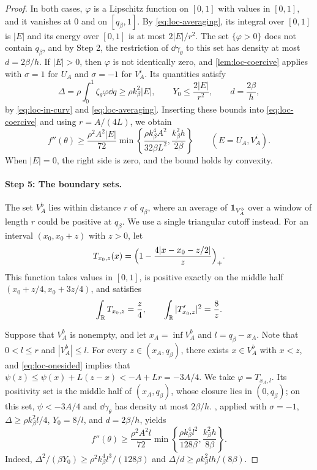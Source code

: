 \begin{proof}
In both cases, $\varphi$ is a Lipschitz function on $[0,1]$ with values in
$[0,1]$, and it vanishes at $0$ and on $[q_\beta,1]$. By
\eqref{eq:loc-averaging}, its integral over $[0,1]$ is $|E|$ and its energy
over $[0,1]$ is at most $2|E|/r^2$. The set $\{\varphi>0\}$
does not contain $q_\beta$, and by Step 2, the restriction of
$\dd\gamma_\theta$ to this set has density at most $d=2\beta/h$. If $|E|>0$,
then $\varphi$ is not identically zero, and \cref{lem:loc-coercive} applies
with $\sigma=1$ for $U_A$ and $\sigma=-1$ for $V_A^i$. Its quantities satisfy
\[
 \Delta=\rho\int_0^1\zeta_\theta\varphi\dd q\ge\rho k_\beta^2|E|,\qquad
 Y_0\le\frac{2|E|}{r^2},\qquad d=\frac{2\beta}h,
\]
by \eqref{eq:loc-in-curv} and \eqref{eq:loc-averaging}. Inserting these bounds
into \eqref{eq:loc-coercive} and using $r=A/(4L)$, we obtain
\begin{equation}\label{eq:loc-cutoff-interior}
 f''(\theta)\ge\frac{\rho^2A^2|E|}{72}
 \min\left\{\frac{\rho k_\beta^4A^2}{32\beta L^2},
 \frac{k_\beta^2h}{2\beta}\right\}
 \qquad(E=U_A,V_A^i).
\end{equation}
When $|E|=0$, the right side is zero, and the bound holds by convexity.

\paragraph{Step 5: The boundary sets.}
The set $V_A^b$ lies within distance $r$ of $q_\beta$, where an average of
$\mathbf1_{V_A^b}$ over a window of length $r$ could be positive at $q_\beta$. We
use a single triangular cutoff instead. For an interval $(x_0,x_0+z)$ with
$z>0$, let
\[
 T_{x_0,z}(x)=\Bigl(1-\frac{4|x-x_0-z/2|}{z}\Bigr)_+ .
\]
This function takes values in $[0,1]$, is positive exactly on the middle half
$(x_0+z/4,x_0+3z/4)$, and satisfies
\[
 \int_\mathbb R T_{x_0,z}=\frac z4,\qquad\int_\mathbb R|T_{x_0,z}'|^2=\frac8z .
\]

Suppose that $V_A^b$ is nonempty, and let $x_A=\inf V_A^b$ and
$l=q_\beta-x_A$. Note that $0<l\le r$ and $|V_A^b|\le l$. For every
$z\in(x_A,q_\beta)$, there exists $x\in V_A^b$ with $x<z$, and
\eqref{eq:loc-onesided} implies that $\psi(z)\le\psi(x)+L(z-x)<-A+Lr=-3A/4$.
We take $\varphi=T_{x_A,l}$. Its positivity set is the middle half of
$(x_A,q_\beta)$, whose closure lies in $(0,q_\beta)$; on this set, $\psi<-3A/4$
and $\dd\gamma_\theta$ has density at most $2\beta/h$. ,
applied with $\sigma=-1$, $\Delta\ge\rho k_\beta^2l/4$, $Y_0=8/l$, and
$d=2\beta/h$, yields
\begin{equation}\label{eq:loc-cutoff-boundary}
 f''(\theta)\ge\frac{\rho^2A^2l}{72}
 \min\left\{\frac{\rho k_\beta^4l^2}{128\beta},
                    \frac{k_\beta^2h}{8\beta}\right\}.
\end{equation}
Indeed, $\Delta^2/(\beta Y_0)\ge\rho^2k_\beta^4l^3/(128\beta)$ and
$\Delta/d\ge\rho k_\beta^2lh/(8\beta)$.


\end{proof}
